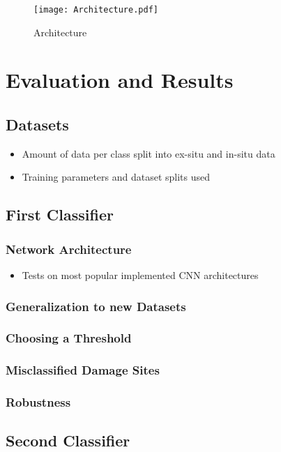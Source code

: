\documentclass[10pt,a4paper]{report}
\begin{document}
\begin{figure}
\begin{center}
  \texttt{[image: Architecture.pdf]}
\caption{Architecture}
\label{fig:Architecture}
\end{center}
\end{figure}

\chapter{Evaluation and Results}
\section{Datasets}
\begin{itemize}
\item Amount of data per class split into ex-situ and in-situ data
\item Training parameters and dataset splits used
\end{itemize}
\section{First Classifier}
\subsection{Network Architecture}
\begin{itemize}
\item Tests on most popular implemented CNN architectures
\end{itemize}
\subsection{Generalization to new Datasets}
\subsection{Choosing a Threshold}
\subsection{Misclassified Damage Sites}
\subsection{Robustness}

\section{Second Classifier}
\end{document}
